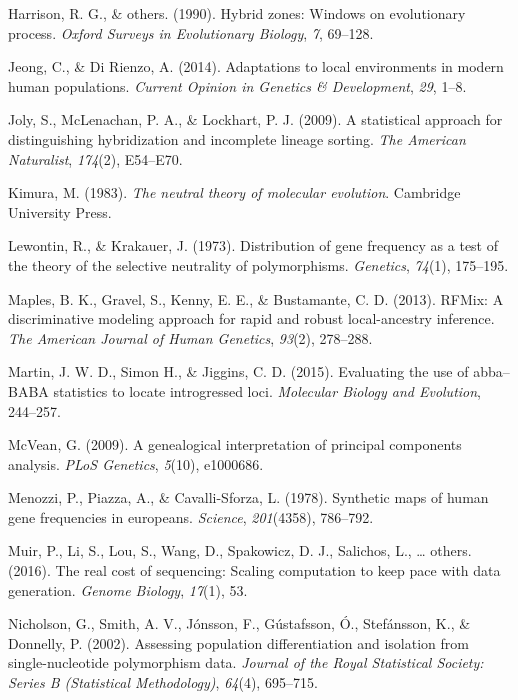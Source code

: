 \documentclass[12pt,twoside]{ugathesis}
\begin{document}
\hypertarget{ref-harrison1990hybrid}{}
Harrison, R. G., \& others. (1990). Hybrid zones: Windows on
evolutionary process. \emph{Oxford Surveys in Evolutionary Biology},
\emph{7}, 69--128.

\hypertarget{ref-jeong2014adaptations}{}
Jeong, C., \& Di Rienzo, A. (2014). Adaptations to local environments in
modern human populations. \emph{Current Opinion in Genetics \&
Development}, \emph{29}, 1--8.

\hypertarget{ref-joly2009statistical}{}
Joly, S., McLenachan, P. A., \& Lockhart, P. J. (2009). A statistical
approach for distinguishing hybridization and incomplete lineage
sorting. \emph{The American Naturalist}, \emph{174}(2), E54--E70.

\hypertarget{ref-kimura1983neutral}{}
Kimura, M. (1983). \emph{The neutral theory of molecular evolution}.
Cambridge University Press.

\hypertarget{ref-lewontin1973distribution}{}
Lewontin, R., \& Krakauer, J. (1973). Distribution of gene frequency as
a test of the theory of the selective neutrality of polymorphisms.
\emph{Genetics}, \emph{74}(1), 175--195.

\hypertarget{ref-maples2013rfmix}{}
Maples, B. K., Gravel, S., Kenny, E. E., \& Bustamante, C. D. (2013).
RFMix: A discriminative modeling approach for rapid and robust
local-ancestry inference. \emph{The American Journal of Human Genetics},
\emph{93}(2), 278--288.

\hypertarget{ref-martin2000}{}
Martin, J. W. D., Simon H., \& Jiggins, C. D. (2015). Evaluating the use
of abba--BABA statistics to locate introgressed loci. \emph{Molecular
Biology and Evolution}, 244--257.

\hypertarget{ref-mcvean2009genealogical}{}
McVean, G. (2009). A genealogical interpretation of principal components
analysis. \emph{PLoS Genetics}, \emph{5}(10), e1000686.

\hypertarget{ref-menozzi1978synthetic}{}
Menozzi, P., Piazza, A., \& Cavalli-Sforza, L. (1978). Synthetic maps of
human gene frequencies in europeans. \emph{Science}, \emph{201}(4358),
786--792.

\hypertarget{ref-muir2016real}{}
Muir, P., Li, S., Lou, S., Wang, D., Spakowicz, D. J., Salichos, L.,
\ldots{} others. (2016). The real cost of sequencing: Scaling
computation to keep pace with data generation. \emph{Genome Biology},
\emph{17}(1), 53.

\hypertarget{ref-nicholson2002assessing}{}
Nicholson, G., Smith, A. V., Jónsson, F., Gústafsson, Ó., Stefánsson,
K., \& Donnelly, P. (2002). Assessing population differentiation and
isolation from single-nucleotide polymorphism data. \emph{Journal of the
Royal Statistical Society: Series B (Statistical Methodology)},
\emph{64}(4), 695--715.
\end{document}
